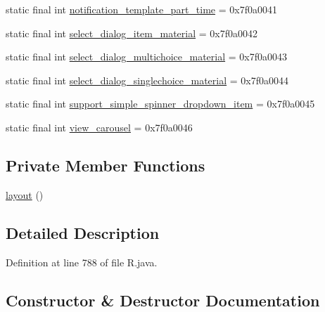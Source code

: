 \begin{DoxyCompactItemize}
\item 
static final int \mbox{\hyperlink{classcom_1_1synnapps_1_1carouselview_1_1_r_1_1layout_a200d8fe066bf1aeecfe02a7eb877a3f5}{notification\+\_\+template\+\_\+part\+\_\+time}} = 0x7f0a0041
\item 
static final int \mbox{\hyperlink{classcom_1_1synnapps_1_1carouselview_1_1_r_1_1layout_a542d73cfbed890071b9ede482476f613}{select\+\_\+dialog\+\_\+item\+\_\+material}} = 0x7f0a0042
\item 
static final int \mbox{\hyperlink{classcom_1_1synnapps_1_1carouselview_1_1_r_1_1layout_a3cafa22527d16ff1f515418cbbdc9931}{select\+\_\+dialog\+\_\+multichoice\+\_\+material}} = 0x7f0a0043
\item 
static final int \mbox{\hyperlink{classcom_1_1synnapps_1_1carouselview_1_1_r_1_1layout_a12bee3aa1df337501204f2fffac69349}{select\+\_\+dialog\+\_\+singlechoice\+\_\+material}} = 0x7f0a0044
\item 
static final int \mbox{\hyperlink{classcom_1_1synnapps_1_1carouselview_1_1_r_1_1layout_a5a26397522f2bdbc1d22ebb16c274704}{support\+\_\+simple\+\_\+spinner\+\_\+dropdown\+\_\+item}} = 0x7f0a0045
\item 
static final int \mbox{\hyperlink{classcom_1_1synnapps_1_1carouselview_1_1_r_1_1layout_a6d9537890b32e70686d76cdbb4712975}{view\+\_\+carousel}} = 0x7f0a0046
\end{DoxyCompactItemize}
\subsection*{Private Member Functions}
\begin{DoxyCompactItemize}
\item 
\mbox{\hyperlink{classcom_1_1synnapps_1_1carouselview_1_1_r_1_1layout_a2b78dfb67976ea370de4984c6502f479}{layout}} ()
\end{DoxyCompactItemize}


\subsection{Detailed Description}


Definition at line 788 of file R.\+java.



\subsection{Constructor \& Destructor Documentation}
\mbox{\label{classcom_1_1synnapps_1_1carouselview_1_1_r_1_1layout_a2b78dfb67976ea370de4984c6502f479}} 
